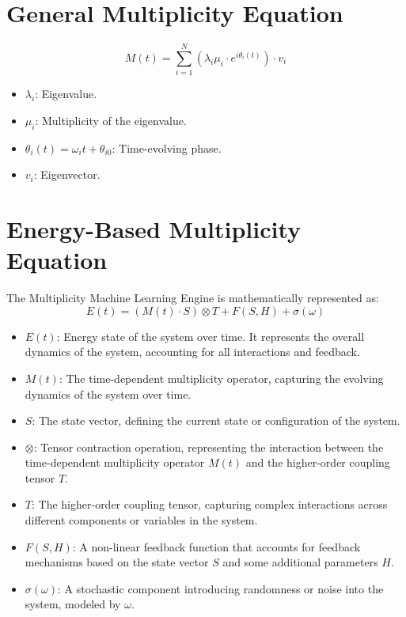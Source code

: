 \documentclass{article}
\theoremstyle{plain}
\begin{document}
\section{General Multiplicity Equation}
\begin{equation}
M(t) = \sum_{i=1}^N \left( \lambda_i \mu_i \cdot e^{i\theta_i(t)} \right) \cdot v_i
\end{equation}
\begin{itemize}
    \item \( \lambda_i \): Eigenvalue.
    \item \( \mu_i \): Multiplicity of the eigenvalue.
    \item \( \theta_i(t) = \omega_i t + \theta_{i0} \): Time-evolving phase.
    \item \( v_i \): Eigenvector.
\end{itemize}

\section{Energy-Based Multiplicity Equation}

The Multiplicity Machine Learning Engine is mathematically represented as:
\begin{equation}
E(t) = (M(t) \cdot S) \otimes T + F(S, H) + \sigma(\omega)
\end{equation}

\begin{itemize}
    \item \textbf{\( E(t) \)}: Energy state of the system over time. It represents the overall dynamics of the system, accounting for all interactions and feedback.
    \item \textbf{\( M(t) \)}: The time-dependent multiplicity operator, capturing the evolving dynamics of the system over time.
    \item \textbf{\( S \)}: The state vector, defining the current state or configuration of the system.
    \item \textbf{\( \otimes \)}: Tensor contraction operation, representing the interaction between the time-dependent multiplicity operator \( M(t) \) and the higher-order coupling tensor \( T \).
    \item \textbf{\( T \)}: The higher-order coupling tensor, capturing complex interactions across different components or variables in the system.
    \item \textbf{\( F(S, H) \)}: A non-linear feedback function that accounts for feedback mechanisms based on the state vector \( S \) and some additional parameters \( H \).
    \item \textbf{\( \sigma(\omega) \)}: A stochastic component introducing randomness or noise into the system, modeled by \( \omega \).
\end{itemize}
\end{document}
